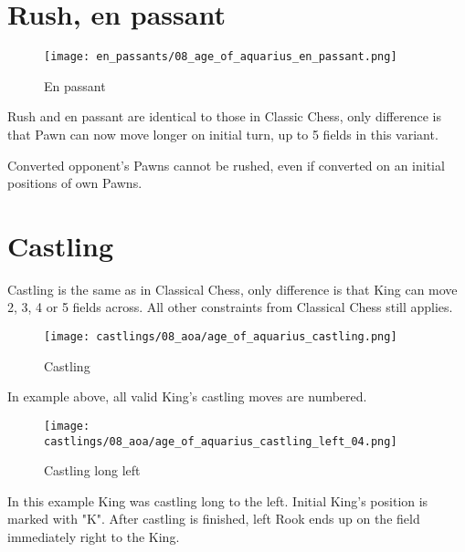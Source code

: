\section*{Rush, en passant}

\noindent
\begin{wrapfigure}{l}{0.4\textwidth}
\centering
\texttt{[image: en\_passants/08\_age\_of\_aquarius\_en\_passant.png]}
\caption{En passant}
\label{fig:08_age_of_aquarius_en_passant}
\end{wrapfigure}
Rush and en passant are identical to those in Classic Chess, only difference
is that Pawn can now move longer on initial turn, up to 5 fields in this
variant.

Converted opponent's Pawns cannot be rushed, even if converted on an initial positions
of own Pawns.

\clearpage %

\section*{Castling}

Castling is the same as in Classical Chess, only difference is that King can move 2, 3, 4 or 5 fields across.
All other constraints from Classical Chess still applies.

\noindent
\begin{figure}[!h]
\texttt{[image: castlings/08\_aoa/age\_of\_aquarius\_castling.png]}
\caption{Castling}
\label{fig:age_of_aquarius_castling}
\end{figure}

In example above, all valid King's castling moves are numbered.

\noindent
\begin{figure}[!h]
\texttt{[image: castlings/08\_aoa/age\_of\_aquarius\_castling\_left\_04.png]}
\caption{Castling long left}
\label{fig:age_of_aquarius_castling_left_04}
\end{figure}

In this example King was castling long to the left. Initial King's position is marked with "K".
After castling is finished, left Rook ends up on the field immediately right to the King.

